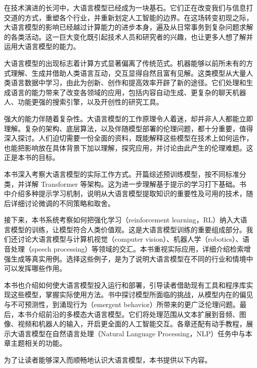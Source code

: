 在技术演进的长河中，大语言模型已经成为一块基石。它们正在改变我们与信息打交道的方式，重塑各个行业，并重新划定人工智能的边界。在这场转变初现之际，大语言模型的影响已经越过计算能力的进步本身，遍及从日常事务到复杂问题求解的各类活动。这一巨大变化既引起技术人员和研究者的兴趣，也让更多人想了解并运用大语言模型的能力。

大语言模型的出现标志着计算方式显著偏离了传统范式。机器能够以前所未有的方式理解、生成并借助人类语言互动，交互显得自然且富有见解。这类模型从大量人类语言数据中学习，由此为创新、创作和提高效率开辟了新的途径。它们处理和生成语言的能力带来了改变各领域的应用，包括内容自动生成、更复杂的聊天机器人、功能更强的搜索引擎，以及开创性的研究工具。

强大的能力伴随着复杂性。大语言模型的工作原理令人着迷，却并非人人都能立即理解。复杂的架构、底层算法，以及伴随模型部署的伦理问题，都十分重要，值得深入探讨。人们迫切需要一份全面的资料，既能解释这些模型在技术上如何运作，也能把影响放在具体背景下加以理解，探究应用，并讨论由此产生的伦理难题。这正是本书的目标。

本书深入考察大语言模型的实际工作方式。开篇综述预训练模型，按不同标准分类，并详解 Transformer 等架构。这为进一步理解基于提示的学习打下基础。书中介绍多种提示学习机制，说明从大语言模型提取知识的重要性及可用的技术，随后详细讨论微调的不同策略和取舍。

接下来，本书系统考察如何把强化学习（reinforcement learning，RL）纳入大语言模型的训练，让模型符合人类价值观。这是大语言模型训练的重要组成部分。我们还讨论大语言模型与计算机视觉（computer vision）、机器人学（robotics）、语音处理（speech processing）等领域的交汇。本书重视实际应用，详细介绍检索增强生成等真实用例。选择这些例子，是为了说明大语言模型在不同的行业和情境中可以发挥哪些作用。

本书也介绍如何使大语言模型投入运行和部署，引导读者借助现有工具和程序库实现这些模型，掌握实际使用方法。书中探讨模型所面临的挑战，从模型内在的偏见与不可预测性，到涌现行为（emergent behavior）所带来的更广泛伦理问题。最后，本书介绍前沿的多模态大语言模型。它们将处理范围从文本扩展到音频、图像、视频和机器人的输入，开启更全面的人工智能交互。各章还配有动手教程，展示大语言模型在自然语言处理（Natural Language Processing，NLP）任务中与本章主题相关的功能。

为了让读者能够深入而顺畅地认识大语言模型，本书提供以下内容。

